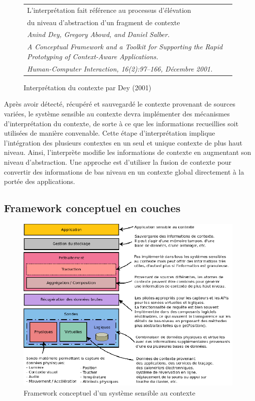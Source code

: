 \begin{figure}[H]
    \centering
    \begin{tabular}{l}
        L'interprétation fait référence au processus d'élévation \\
        du niveau d'abstraction d'un fragment de contexte
        \cite{dey_conceptual_2001} \\
        \em \footnotesize  Anind Dey, Gregory Abowd, and Daniel Salber. \\
        \em \footnotesize A Conceptual Framework and a Toolkit for Supporting the 
        Rapid Prototyping of Context-Aware Applications. \\
        \em \footnotesize Human-Computer Interaction, 16(2):97–166, Décembre 2001. 
    \end{tabular}
    \caption{Interprétation du contexte par Dey (2001)}
    \label{fig:quote}
\end{figure}

Après avoir détecté, récupéré et sauvegardé le contexte provenant de sources
variées, le système sensible au contexte devra implémenter des mécanismes
d'interprétation du contexte, de sorte à ce que les informations recueillies
soit utilisées de manière convenable. Cette étape d'interprétation implique
l'intégration des plusieurs contextes en un seul et unique contexte de plus haut
niveau. Ainsi, l'interprète modifie les informations de contexte en augmentant
son niveau d'abstraction. Une approche est d'utiliser la fusion de contexte
pour convertir des informations de bas niveau en un contexte global directement
à la portée des applications.

\subsection{Framework conceptuel en couches}

\begin{figure}[H]
    \centering
    \includegraphics[width=\textwidth]{img/layered_conceptual_framework}
    \caption{Framework conceptuel d'un système sensible au contexte}
    \label{archi}
\end{figure}

